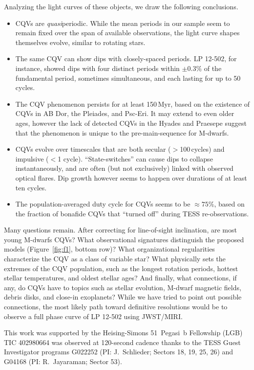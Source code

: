 \documentclass[11pt,twocolumn,tighten]{aastex63}
\begin{document}
Analyzing the light curves of these objects, we draw the following conclusions.

\begin{itemize}
	\item CQVs are {\it quasi}periodic.  While the mean periods in our
	sample seem to remain fixed over the span of available observations, the light curve
	shapes themselves evolve, similar to rotating stars.
	\item The same CQV can show dips with closely-spaced periods.  
	LP 12-502, for instance, showed dips with four distinct periods within $\pm 0.3\%$
	of the fundamental period, sometimes simultaneous, and each lasting for up to 50 cycles.
	\item The CQV phenomenon persists for at least 150\,Myr, based on the
	existence of CQVs in AB Dor, the Pleiades, and Psc-Eri.  It may extend to
	even older ages, however the lack of detected CQVs in the Hyades and
	Praesepe suggest that the phenomenon is unique to the pre-main-sequence
	for M-dwarfs.
	\item CQVs evolve over timescales that are both secular ($>$100\,cycles) and impulsive ($<$1 cycle).
	``State-switches'' can cause dips to collapse instantaneously, and are often (but not exclusively)
	linked with observed optical flares.
	Dip growth however seems to happen over durations of at least ten cycles.
	\item The population-averaged duty cycle for CQVs seems to be $\approx 75$\%, based on 
	the fraction of bonafide CQVs that ``turned off'' during TESS re-observations.
\end{itemize}

Many questions remain.
After correcting for line-of-sight inclination, are
most young M-dwarfs CQVs?  What observational signatures distinguish
the proposed models (Figure~\ref{fig:f1}, bottom row)?  What
organizational regularities characterize the CQV as a class of
variable star?  What physically sets the extremes of the CQV population, such as
the longest rotation periods, hottest stellar temperatures, and oldest
stellar ages?  And finally, what connections, if any, do CQVs have to
topics such as stellar evolution, M-dwarf magnetic fields, debris
disks, and close-in exoplanets?
While we have tried to point out possible connections, the most
likely path toward definitive resolutions would be to observe a full
phase curve of LP 12-502 using JWST/MIRI.



\acknowledgments
This work was supported by the 
Heising-Simons 51~Pegasi~b Fellowship (LGB)
TIC 402980664 was observed at 120-second cadence thanks to the TESS Guest
Investigator programs G022252 (PI: J.~Schlieder; Sectors 18, 19, 25,
26) and G04168 (PI: R.~Jayaraman; Sector 53).
\end{document}
